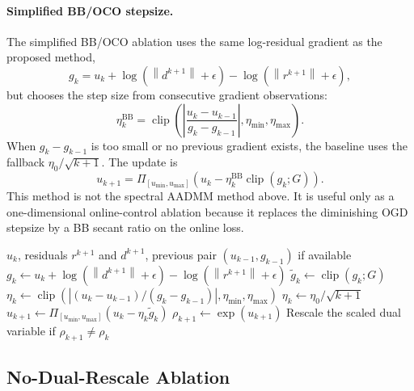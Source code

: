 \documentclass[11pt]{article}
\newcommand{\norm}[1]{\left\lVert #1 \right\rVert}
\begin{document}
\paragraph{Simplified BB/OCO stepsize.}

The simplified BB/OCO ablation uses the same log-residual gradient
as the proposed method,
\begin{equation}
    g_k
    =
    u_k+\log(\norm{d^{k+1}}+\epsilon)
    -
    \log(\norm{r^{k+1}}+\epsilon),
\end{equation}
but chooses the step size from consecutive gradient observations:
\begin{equation}
    \eta_k^{\mathrm{BB}}
    =
    \operatorname{clip}
    \left(
        \left|
        \frac{u_k-u_{k-1}}{g_k-g_{k-1}}
        \right|,
        \eta_{\min},
        \eta_{\max}
    \right).
    \label{eq:bb-stepsize}
\end{equation}
When $g_k-g_{k-1}$ is too small or no previous gradient exists, the baseline
uses the fallback $\eta_0/\sqrt{k+1}$.  The update is
\begin{equation}
    u_{k+1}
    =
    \Pi_{[u_{\min},u_{\max}]}
    \left(u_k-\eta_k^{\mathrm{BB}}\operatorname{clip}(g_k;G)\right).
\end{equation}
This method is not the spectral AADMM method above.  It is useful only as a
one-dimensional online-control ablation because it replaces the diminishing OGD
stepsize by a BB secant ratio on the online loss.

\begin{algorithm}[t]
\caption{Simplified BB/OCO log-penalty update}
\label{alg:bb-online}
\begin{algorithmic}[1]
\Require $u_k$, residuals $r^{k+1}$ and $d^{k+1}$, previous pair
         $(u_{k-1},g_{k-1})$ if available
\State $g_k\gets u_k+\log(\norm{d^{k+1}}+\epsilon)
       -\log(\norm{r^{k+1}}+\epsilon)$
\State $\widetilde{g}_k\gets\operatorname{clip}(g_k;G)$
    \State $\eta_k\gets
    \operatorname{clip}(|(u_k-u_{k-1})/(g_k-g_{k-1})|,
    \eta_{\min},\eta_{\max})$
\Else
    \State $\eta_k\gets \eta_0/\sqrt{k+1}$
\EndIf
\State $u_{k+1}\gets
\Pi_{[u_{\min},u_{\max}]}\left(u_k-\eta_k\widetilde{g}_k\right)$
\State $\rho_{k+1}\gets \exp(u_{k+1})$
\State Rescale the scaled dual variable if $\rho_{k+1}\neq\rho_k$
\end{algorithmic}
\end{algorithm}

\subsection{No-Dual-Rescale Ablation}
\end{document}
